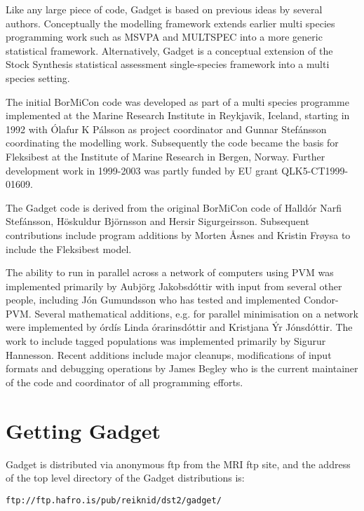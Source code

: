 \documentclass [a4paper, 10pt]{book}
\begin{document}
\bigskip
Like any large piece of code, Gadget is based on previous ideas by several authors.  Conceptually the modelling framework extends earlier multi species programming work such as MSVPA and MULTSPEC into a more generic statistical framework.  Alternatively, Gadget is a conceptual extension of the Stock Synthesis statistical assessment single-species framework into a multi species setting.

\bigskip
The initial BorMiCon code was developed as part of a multi species programme implemented at the Marine Research Institute in Reykjavik, Iceland, starting in 1992 with \'{O}lafur K P\'{a}lsson as project coordinator and Gunnar Stef\'{a}nsson coordinating the modelling work.  Subsequently the code became the basis for Fleksibest at the Institute of Marine Research in Bergen, Norway.  Further development work in 1999-2003 was partly funded by EU grant QLK5-CT1999-01609.

\bigskip
The Gadget code is derived from the original BorMiCon code of Halld\'{o}r Narfi Stef\'{a}nsson, H\"{o}skuldur Bj\"{o}rnsson and Hersir Sigurgeirsson.  Subsequent contributions include program additions by Morten {\AA}snes and Kristin Fr{\o}ysa to include the Fleksibest model.

\bigskip
The ability to run in parallel across a network of computers using PVM was implemented primarily by Au{\dh}bj\"{o}rg Jakobsd\'{o}ttir with input from several other people, including J\'{o}n Gu{\dh}mundsson who has tested and implemented Condor-PVM.  Several mathematical additions, e.g. for parallel minimisation on a network were implemented by {\TH}\'{o}rd\'{i}s Linda {\TH}\'{o}rarinsd\'{o}ttir and Kristjana \'{Y}r J\'{o}nsd\'{o}ttir.  The work to include tagged populations was implemented primarily by Sigur{\dh}ur Hannesson.  Recent additions include major cleanups, modifications of input formats and debugging operations by James Begley who is the current maintainer of the code and coordinator of all programming efforts.

\section{Getting Gadget}\label{sec:gettinggadget}
Gadget is distributed via anonymous ftp from the MRI ftp site, and the address of the top level directory of the Gadget distributions is:

{\small\begin{verbatim}
ftp://ftp.hafro.is/pub/reiknid/dst2/gadget/
\end{verbatim}}
\end{document}
